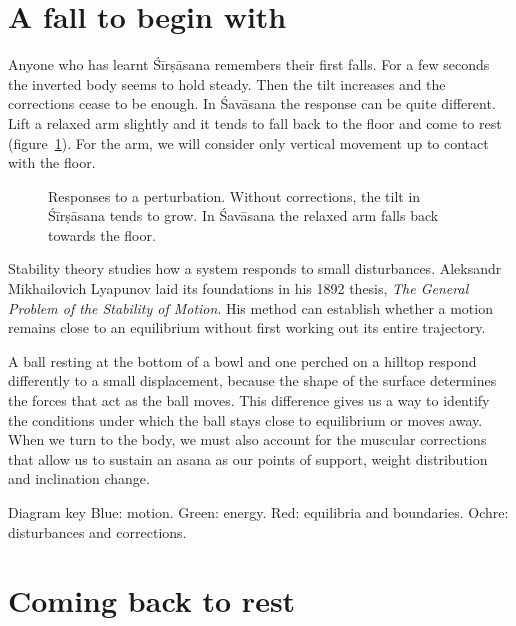 
\frontespizio

\section*{A fall to begin with}

Anyone who has learnt Śīrṣāsana remembers their first falls. For a few seconds the inverted body seems to hold steady. Then the tilt increases and the corrections cease to be enough. In Śavāsana the response can be quite different. Lift a relaxed arm slightly and it tends to fall back to the floor and come to rest (figure~\ref{fig:apertura}). For the arm, we will consider only vertical movement up to contact with the floor.

\begin{figure}
\caption{Responses to a perturbation. Without corrections, the tilt in Śīrṣāsana tends to grow. In Śavāsana the relaxed arm falls back towards the floor.}
\label{fig:apertura}
\end{figure}

Stability theory studies how a system responds to small disturbances. Aleksandr Mikhailovich Lyapunov laid its foundations in his 1892 thesis, \emph{The General Problem of the Stability of Motion}. His method can establish whether a motion remains close to an equilibrium without first working out its entire trajectory.

A ball resting at the bottom of a bowl and one perched on a hilltop respond differently to a small displacement, because the shape of the surface determines the forces that act as the ball moves. This difference gives us a way to identify the conditions under which the ball stays close to equilibrium or moves away. When we turn to the body, we must also account for the muscular corrections that allow us to sustain an asana as our points of support, weight distribution and inclination change.

\begin{riquadro}{Diagram key}
Blue: motion. Green: energy. Red: equilibria and boundaries. Ochre: disturbances and corrections.
\end{riquadro}

\section{Coming back to rest}\label{sec:tornare}


